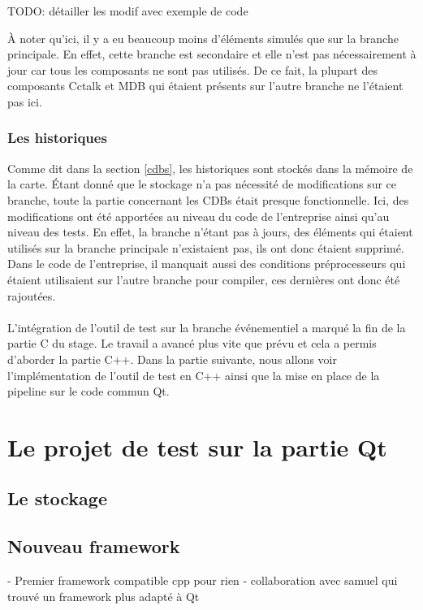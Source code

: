 \documentclass[a4paper]{article}
\begin{document}
TODO: détailler les modif avec exemple de code

À noter qu'ici, il y a eu beaucoup moins d'éléments simulés que sur la branche
principale. En effet, cette branche est secondaire et elle n'est pas
nécessairement à jour car tous les composants ne sont pas utilisés. De ce fait,
la plupart des composants Cctalk et MDB qui étaient présents sur l'autre branche
ne l'étaient pas ici.

\subsubsection*{Les historiques}

Comme dit dans la section \ref{cdbs}, les historiques sont stockés dans la
mémoire de la carte. Étant donné que le stockage n'a pas nécessité de
modifications sur ce branche, toute la partie concernant les CDBs était presque
fonctionnelle. Ici, des modifications ont été apportées au niveau du code de
l'entreprise ainsi qu'au niveau des tests. En effet, la branche n'étant pas à
jours, des éléments qui étaient utilisés sur la branche principale n'existaient
pas, ils ont donc étaient supprimé. Dans le code de l'entreprise, il manquait
aussi des conditions préprocesseurs qui étaient utilisaient sur l'autre branche
pour compiler, ces dernières ont donc été rajoutées.
\\~\\

L'intégration de l'outil de test sur la branche événementiel a marqué la fin de
la partie C du stage. Le travail a avancé plus vite que prévu et cela a permis
d'aborder la partie C++. Dans la partie suivante, nous allons voir
l'implémentation de l'outil de test en C++ ainsi que la mise en place de la
pipeline sur le code commun Qt.
\section{Le projet de test sur la partie Qt}%

\subsection{Le stockage}

\subsection{Nouveau framework}

- Premier framework compatible cpp pour rien
- collaboration avec samuel qui trouvé un framework plus adapté à Qt
\end{document}
